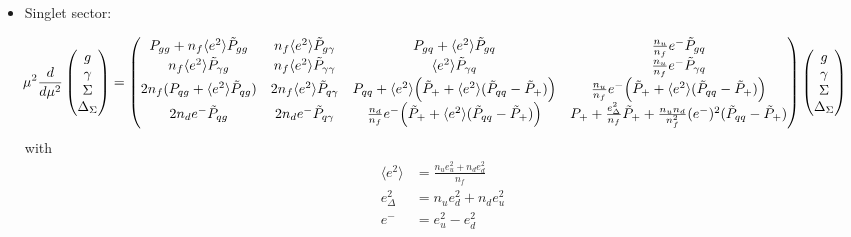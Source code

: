 \documentclass[a4paper,twoside]{article}
\title{}
\author{}
\date{}
\begin{document}
\maketitle
\begin{itemize}
\item Singlet sector:

\begin{equation*}
\hspace*{-0.4cm}\mu^2\frac{d}{d\mu^2}
\begin{pmatrix}
g \\
\gamma \\
\Sigma \\
\Delta_\Sigma
\end{pmatrix}
=
\begin{pmatrix}
 P_{gg}+n_f \langle e^2\rangle \tilde{P}_{gg} & n_f \langle e^2\rangle \tilde{P}_{g\gamma} & P_{gq} + \langle e^2\rangle \tilde{P}_{gq} & \frac{n_u}{n_f}e^- \tilde{P}_{gq} \\
 n_f \langle e^2\rangle \tilde{P}_{\gamma g} & n_f \langle e^2\rangle \tilde{P}_{\gamma \gamma} & \langle e^2\rangle \tilde{P}_{\gamma q} & \frac{n_u}{n_f}e^- \tilde{P}_{\gamma q} \\
 2n_f (P_{qg} +\langle e^2\rangle  \tilde{P}_{qg} )& 2 n_f \langle e^2\rangle  \tilde{P}_{q\gamma} & P_{qq}+ \langle e^2\rangle \Bigl(\tilde{P}_{+} + \langle e^2\rangle(\tilde{P}_{qq}-\tilde{P}_{+})\Bigr) & \frac{n_u}{n_f}e^-\Bigl(\tilde{P}_{+}+ \langle e^2\rangle (\tilde{P}_{qq}-\tilde{P}_{+}) \Bigr)\\
 2n_de^-\tilde{P}_{qg} & 2n_de^-\tilde{P}_{q\gamma} & \frac{n_d}{n_f}e^-\Bigl( \tilde{P}_{+} +  \langle e^2\rangle (\tilde{P}_{qq}-\tilde{P}_{+}) \Bigr)& P_+ +\frac{e_\Delta^2}{n_f}\tilde{P}_{+} +\frac{n_u n_d}{n_f^2}(e^-)^2(\tilde{P}_{qq}-\tilde{P}_{+})
\end{pmatrix}
\begin{pmatrix}
g \\
\gamma \\
\Sigma \\
\Delta_\Sigma
\end{pmatrix}
\end{equation*}
with
\begin{align*}
 \langle e^2\rangle&=\frac{n_u e_u^2+n_d e_d^2}{n_f} \\
e_\Delta^2&=n_u e_d^2+n_d e_u^2 \\
e^- &= e_u^2 -e_d^2
\end{align*}


\end{itemize}
\end{document}
